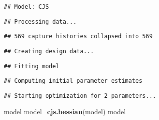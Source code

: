 \documentclass[]{article}
\newenvironment{Shaded}{\begin{snugshade}}{\end{snugshade}}
\newcommand{\KeywordTok}[1]{\textcolor[rgb]{0.13,0.29,0.53}{\textbf{#1}}}
\newcommand{\DataTypeTok}[1]{\textcolor[rgb]{0.13,0.29,0.53}{#1}}
\newcommand{\DecValTok}[1]{\textcolor[rgb]{0.00,0.00,0.81}{#1}}
\newcommand{\StringTok}[1]{\textcolor[rgb]{0.31,0.60,0.02}{#1}}
\newcommand{\OperatorTok}[1]{\textcolor[rgb]{0.81,0.36,0.00}{\textbf{#1}}}
\newcommand{\NormalTok}[1]{#1}
\begin{document}
\begin{verbatim}
## Model: CJS
\end{verbatim}

\begin{verbatim}
## Processing data...
\end{verbatim}

\begin{verbatim}
## 569 capture histories collapsed into 569
\end{verbatim}

\begin{verbatim}
## Creating design data...
\end{verbatim}

\begin{verbatim}
## Fitting model
\end{verbatim}

\begin{verbatim}
## Computing initial parameter estimates
\end{verbatim}

\begin{verbatim}
## Starting optimization for 2 parameters...
\end{verbatim}

\begin{Shaded}
\begin{Highlighting}[]
\NormalTok{model}
\NormalTok{model=}\KeywordTok{cjs.hessian}\NormalTok{(model)}
\NormalTok{model}
\end{Highlighting}
\end{Shaded}

\begin{Shaded}
\end{Shaded}
\end{document}
